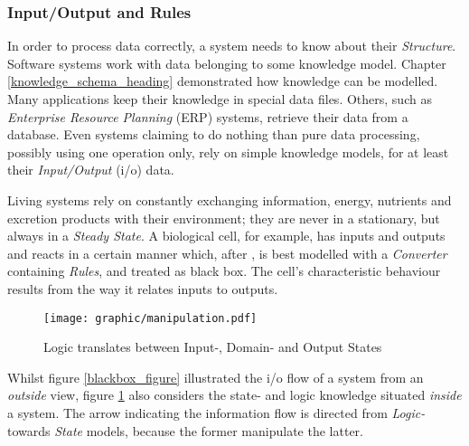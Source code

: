%
%
%
%
%
%
%

\subsubsection{Input/Output and Rules}
\label{input_output_and_rules_heading}

In order to process data correctly, a system needs to know about their
\emph{Structure}. Software systems work with data belonging to some knowledge
model. Chapter \ref{knowledge_schema_heading} demonstrated how knowledge can be
modelled. Many applications keep their knowledge in special data files. Others,
such as \emph{Enterprise Resource Planning} (ERP) systems, retrieve their data
from a database. Even systems claiming to do nothing than pure data processing,
possibly using one operation only, rely on simple knowledge models, for at
least their \emph{Input/Output} (i/o) data.

Living systems rely on constantly exchanging information, energy, nutrients and
excretion products with their environment; they are never in a stationary, but
always in a \emph{Steady State}. A biological cell, for example, has inputs and
outputs and reacts in a certain manner which, after \cite{sengbusch}, is best
modelled with a \emph{Converter} containing \emph{Rules}, and treated as black
box. The cell's characteristic behaviour results from the way it relates inputs
to outputs.

\begin{figure}[ht]
    \begin{center}
        \texttt{[image: graphic/manipulation.pdf]}
        \caption{Logic translates between Input-, Domain- and Output States}
        \label{manipulation_figure}
    \end{center}
\end{figure}

Whilst figure \ref{blackbox_figure} illustrated the i/o flow of a system from
an \emph{outside} view, figure \ref{manipulation_figure} also considers the
state- and logic knowledge situated \emph{inside} a system. The arrow
indicating the information flow is directed from \emph{Logic-} towards
\emph{State} models, because the former manipulate the latter.
